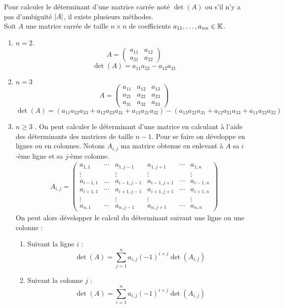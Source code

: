 Pour calculer le déterminant d'une matrice carrée noté $\det(A)$ ou s'il n'y a pas d'ambiguïté $\abs{A}$, il existe plusieurs méthodes.
	\\
    Soit $A$ une matrice carrée de taille $n \times n$ de coefficients $a_{11},\ldots,a_{nn} \in \mathbb{K}$. 
    \begin{enumerate}
        \item $n = 2$. 
        \[ 
        A = 
        \begin{pmatrix}
            a_{11} & a_{12} \\
            a_{21} & a_{22}
        \end{pmatrix}
        \]
        \[ \det(A) = a_{11} a_{22} - a_{12} a_{21} \]
        \item $n = 3$
        \[
        A = 
        \begin{pmatrix}
            a_{11} & a_{12} & a_{13} \\
            a_{21} & a_{22} & a_{23} \\
            a_{31} & a_{32} & a_{33}
        \end{pmatrix}
        \]
        \[ \det(A) = (a_{11} a_{22} a_{33} + a_{12} a_{23} a_{31} + a_{13} a_{21} a_{32} ) - (a_{13} a_{22} a_{31} + a_{12} a_{21} a_{33} + a_{11} a_{23} a_{32}) \]
        \item $n \geq 3$ \cite{wikipedia_determinant}.
        On peut calculer le déterminant d'une matrice en calculant à l'aide des déterminants des matrices de taille $n-1$. Pour se faire on développe en lignes ou en colonnes.
        Notons $A_{i,j}$ ma matrice obtenue en enlevant à $A$ sa $i$-ème ligne et sa $j$-ème colonne.
        \begin{align*}
        	A_{i,j} = 
        	\begin{pmatrix}
        		a_{1,1} & \cdots & a_{1, j-1} & a_{1, j+1} & \cdots & a_{1,n} \\
        		\vdots & & \vdots & \vdots & & \vdots \\
        		a_{i-1, 1} & \ldots & a_{i-1, j-1} & a_{i-1, j+1} & \cdots & a_{i-1,n} \\
        		a_{i+1, 1} & \cdots & a_{i+1, j-1} & a_{i+1, j+1} & \cdots & a_{i+1, n} \\
        		\vdots & & \vdots & \vdots & & \vdots \\
        		a_{n,1} & \cdots & a_{n,j-1} & a_{n,j+1} & \cdots & a_{n,n}
        	\end{pmatrix}
        \end{align*}
        On peut alors développer le calcul du déterminant  suivant une ligne ou une colonne : 
        \begin{enumerate}
        	\item Suivant la ligne $i$ : 
        	\[ \det(A) = \sum_{j=1}^n a_{i,j} (-1)^{i+j} \det(A_{i,j}) \]
        	\item Suivant la colonne $j$ : 
        	\[ \det(A) = \sum_{i=1}^n a_{i,j} (-1)^{i+j} \det(A_{i,j}) \]
        \end{enumerate}
    \end{enumerate}

